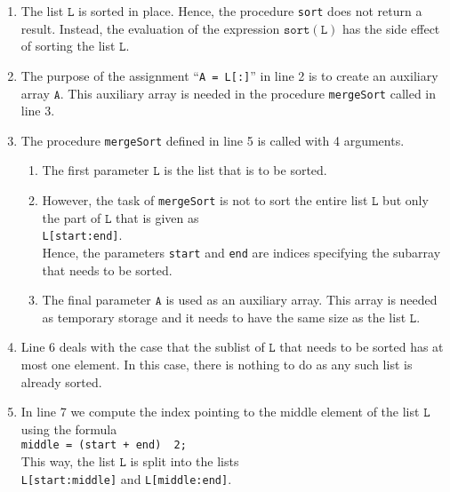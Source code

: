 \begin{enumerate}
\item The list $\mathtt{L}$ is sorted in place. Hence, the procedure 
      \texttt{sort} does not return a result.  Instead, the evaluation of the expression
      $\mathtt{sort}(\mathtt{L})$ has the side effect of sorting the list $\mathtt{L}$.
\item The purpose of the assignment ``\texttt{A = L[:]}'' in line 2 is to create an auxiliary array
      $\texttt{A}$.  This auxiliary array is needed in the procedure
      \texttt{mergeSort} called in line 3.
\item The procedure \texttt{mergeSort} defined in line 5 is called with 4 arguments.
      \begin{enumerate}
      \item The first parameter $\texttt{L}$ is the list that is to be sorted.
      \item However, the task of \texttt{mergeSort} is not to sort the entire list $\texttt{L}$ but only
            the part of $\texttt{L}$ that is given as
            \\[0.2cm]
            \hspace*{1.3cm} 
            \texttt{L[start:end]}. 
            \\[0.2cm]
            Hence, the parameters \texttt{start} and \texttt{end} are indices specifying the 
            subarray that needs to be sorted.
      \item The final parameter $\texttt{A}$ is used as an auxiliary array.  This array is needed
            as temporary storage and it needs to have the same size as the list $\texttt{L}$.
      \end{enumerate} 
\item Line 6 deals with the case that the sublist of $\texttt{L}$ that needs to be sorted has at most one element.  
      In this case, there is nothing to do as any such list is already sorted.
\item In line 7 we compute the index pointing to the middle element of the list $\texttt{L}$ using the
      formula \\[0.2cm]
      \hspace*{1.3cm} 
      \texttt{middle = (start + end) \dv\  2;} 
      \\[0.2cm]
      This way, the list $\texttt{L}$ is split into the lists 
      \\[0.2cm]
      \hspace*{1.3cm}
      \texttt{L[start:middle]} \quad and \quad \texttt{L[middle:end]}.

\end{enumerate}
